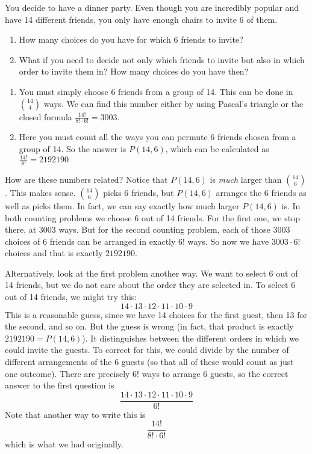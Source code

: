 \documentclass[12pt]{article}
\begin{document}
\begin{example}
  You decide to have a dinner party.  Even though you are incredibly popular and have 14 different friends, you only have enough chairs to invite 6 of them.  
  \begin{enumerate}
    \item How many choices do you have for which 6 friends to invite? 
    \item What if you need to decide not only which friends to invite but also in which order to invite them in?  How many choices do you have then?
  \end{enumerate}
  \begin{solution}
    \begin{enumerate}

      \item You must simply choose 6 friends from a group of 14.  This can be done in ${14 \choose 4}$ ways.  We can find this number either by using Pascal's triangle or the closed formula $\frac{14!}{8!\cdot 6!} = 3003$.
      
      \item Here you must count all the ways you can permute 6 friends chosen from a group of 14.  So the answer is $P(14, 6)$, which can be calculated as $\frac{14!}{8!} = 2192190$
   \end{enumerate}
    How are these numbers related?  Notice that $P(14,6)$ is {\em much} larger than ${14 \choose 6}$.  This makes sense. ${14 \choose 6}$ picks 6 friends, but $P(14,6)$  arranges the 6 friends as well as picks them.  In fact, we can say exactly how much larger $P(14,6)$ is.  In both counting problems we choose 6 out of 14 friends.  For the first one, we stop there, at 3003 ways.  But for the second counting problem, each of those 3003 choices of 6 friends can be arranged in exactly $6!$ ways.  So now we have $3003\cdot 6!$ choices and that is exactly $2192190$.
    
    Alternatively, look at the first problem another way.  We want to select 6 out of 14 friends, but we do not care about the order they are selected in.  To select 6 out of 14 friends, we might try this:
    \[14 \cdot 13 \cdot 12 \cdot 11 \cdot 10 \cdot 9\]
    This is a reasonable guess, since we have 14 choices for the first guest, then 13 for the second, and so on.  But the guess is wrong (in fact, that product is exactly $2192190 = P(14,6)$).  It distinguishes between the different orders in which we could invite the guests.  To correct for this, we could divide by the number of different arrangements of the 6 guests (so that all of these would count as just one outcome).  There are precisely $6!$ ways to arrange 6 guests, so the correct answer to the first question is
    \[\frac{14 \cdot 13 \cdot 12 \cdot 11\cdot 10 \cdot 9}{6!}\]
    Note that another way to write this is
    \[\frac{14!}{8!\cdot 6!}\]
    which is what we had originally.
  \end{solution}

\end{example}
\end{document}
